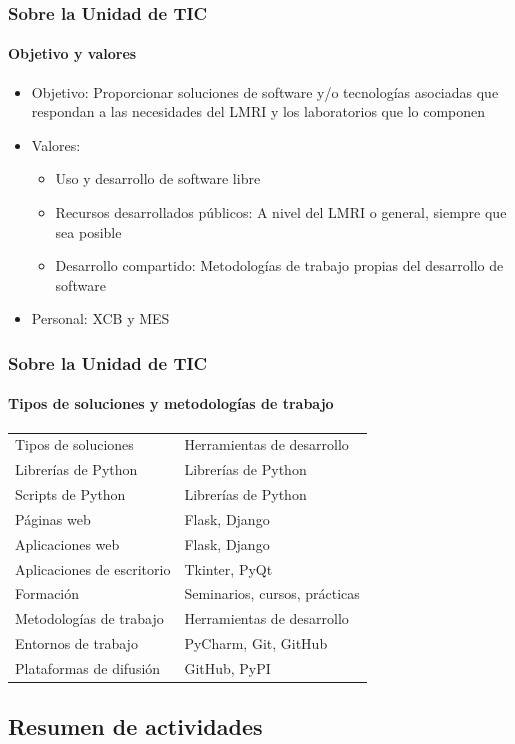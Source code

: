 \documentclass{beamer}
\newcommand{\highlight}[1]{{\color{blue} #1}}
\begin{document}
	\begin{frame}
		\frametitle{Sobre la Unidad de TIC}
		\framesubtitle{Objetivo y valores}
		\begin{itemize}
			\item \highlight{Objetivo}: Proporcionar soluciones de software y/o tecnologías asociadas que respondan a las necesidades del LMRI y los laboratorios que lo componen
			\item \highlight{Valores}:
			\begin{itemize}
				\item Uso y desarrollo de \highlight{software libre}
				\item \highlight{Recursos desarrollados públicos}: A nivel del LMRI o general, siempre que sea posible
				\item \highlight{Desarrollo compartido}: Metodologías de trabajo propias del desarrollo de software
			\end{itemize} 
			\item \highlight{Personal}: XCB y MES
		\end{itemize} 
	\end{frame}
	
	\begin{frame}
		\frametitle{Sobre la Unidad de TIC}
		\framesubtitle{Tipos de soluciones y metodologías de trabajo}
		\centering
		\begin{tabular}{ll}
			\rowcolor{blue!40}
			{\color{white}Tipos de soluciones}&{\color{white}Herramientas de desarrollo}\\
			Librerías de Python&Librerías de Python\\
			Scripts de Python&Librerías de Python\\
			Páginas web&Flask, Django\\
			Aplicaciones web&Flask, Django\\
			Aplicaciones de escritorio&Tkinter, PyQt\\
			Formación&Seminarios, cursos, prácticas\\
			\rowcolor{blue!40}
			{\color{white}Metodologías de trabajo}&{\color{white}Herramientas de desarrollo}\\
			Entornos de trabajo&PyCharm, Git, GitHub\\
			Plataformas de difusión&GitHub, PyPI\\
		\end{tabular}
	\end{frame}
	
	\subsection{Resumen de actividades}
	
\end{document}
